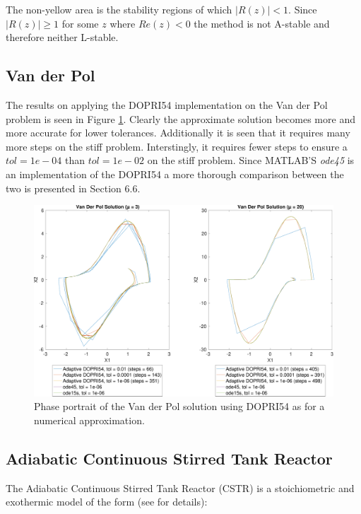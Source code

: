 The non-yellow area is the stability regions of which $|R(z)| < 1$. Since $|R(z)| \geq 1$ for some $z$ where $Re(z) < 0$ the method is not A-stable and therefore neither L-stable.







\subsection{Van der Pol}
The results on applying the DOPRI54 implementation on the Van der Pol problem is seen in Figure \ref{fig:6_4}. Clearly the approximate solution becomes more and more accurate for lower tolerances. Additionally it is seen that it requires many more steps on the stiff problem. Interstingly, it requires fewer steps to ensure a $tol = 1e-04$ than $tol = 1e-02$ on the stiff problem. Since MATLAB'S \textit{ode45} is an implementation of the DOPRI54 a more thorough comparison between the two is presented in Section 6.6.

\begin{figure}[h]
    \centering
    \includegraphics[width=\textwidth]{plots/6_5.pdf}
    \caption{Phase portrait of the Van der Pol solution using DOPRI54 as for a numerical approximation.}
    \label{fig:6_4}
\end{figure}






\subsection{Adiabatic Continuous Stirred Tank Reactor}
The Adiabatic Continuous Stirred Tank Reactor (CSTR) is a stoichiometric and exothermic model of the form (see \cite{Wahlgreen2020NonlinearCSTR} for details):

